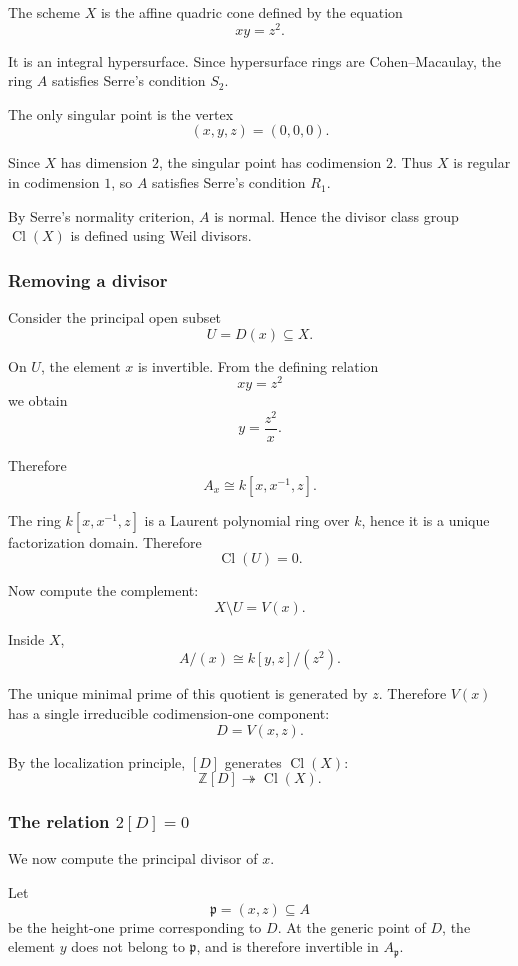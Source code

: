 \documentclass[12pt,a4paper]{article}
\newcommand{\Z}{\mathbb{Z}}
\newcommand{\Cl}{\operatorname{Cl}}
\theoremstyle{notespace}
\begin{document}
The scheme \(X\) is the affine quadric cone defined by the equation
\[
xy=z^2.
\]

It is an integral hypersurface. Since hypersurface rings are Cohen--Macaulay, the ring \(A\) satisfies Serre's condition \(S_2\).

The only singular point is the vertex
\[
(x,y,z)=(0,0,0).
\]

Since \(X\) has dimension \(2\), the singular point has codimension \(2\). Thus \(X\) is regular in codimension \(1\), so \(A\) satisfies Serre's condition \(R_1\).

By Serre's normality criterion, \(A\) is normal. Hence the divisor class group \(\Cl(X)\) is defined using Weil divisors.

\subsubsection{Removing a divisor}

Consider the principal open subset
\[
U=D(x)\subseteq X.
\]

On \(U\), the element \(x\) is invertible. From the defining relation
\[
xy=z^2
\]
we obtain
\[
y=\frac{z^2}{x}.
\]

Therefore
\[
A_x
\cong
k[x,x^{-1},z].
\]

The ring \(k[x,x^{-1},z]\) is a Laurent polynomial ring over \(k\), hence it is a unique factorization domain. Therefore
\[
\Cl(U)=0.
\]

Now compute the complement:
\[
X\setminus U=V(x).
\]

Inside \(X\),
\[
A/(x)
\cong
k[y,z]/(z^2).
\]

The unique minimal prime of this quotient is generated by \(z\). Therefore \(V(x)\) has a single irreducible codimension-one component:
\[
D=V(x,z).
\]

By the localization principle, \([D]\) generates \(\Cl(X)\):
\[
\Z[D]\twoheadrightarrow \Cl(X).
\]

\subsubsection{The relation \(2[D]=0\)}

We now compute the principal divisor of \(x\).

Let
\[
\mathfrak p=(x,z)\subseteq A
\]
be the height-one prime corresponding to \(D\). At the generic point of \(D\), the element \(y\) does not belong to \(\mathfrak p\), and is therefore invertible in \(A_{\mathfrak p}\).
\end{document}
